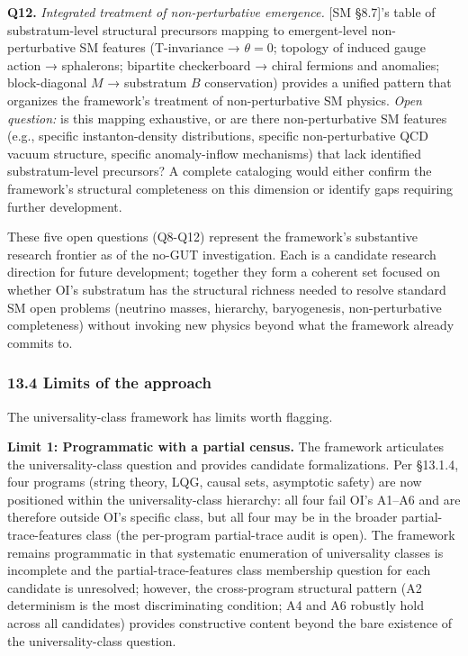 \documentclass[
]{article}
\begin{document}
\textbf{Q12.} \emph{Integrated treatment of non-perturbative emergence.}
{[}SM §8.7{]}'s table of substratum-level structural precursors mapping
to emergent-level non-perturbative SM features (T-invariance →
\(\theta = 0\); topology of induced gauge action → sphalerons; bipartite
checkerboard → chiral fermions and anomalies; block-diagonal \(M\) →
substratum \(B\) conservation) provides a unified pattern that organizes
the framework's treatment of non-perturbative SM physics. \emph{Open
question:} is this mapping exhaustive, or are there non-perturbative SM
features (e.g., specific instanton-density distributions, specific
non-perturbative QCD vacuum structure, specific anomaly-inflow
mechanisms) that lack identified substratum-level precursors? A complete
cataloging would either confirm the framework's structural completeness
on this dimension or identify gaps requiring further development.

These five open questions (Q8-Q12) represent the framework's substantive
research frontier as of the no-GUT investigation. Each is a candidate
research direction for future development; together they form a coherent
set focused on whether OI's substratum has the structural richness
needed to resolve standard SM open problems (neutrino masses, hierarchy,
baryogenesis, non-perturbative completeness) without invoking new
physics beyond what the framework already commits to.

\hypertarget{limits-of-the-approach}{%
\subsubsection{13.4 Limits of the
approach}\label{limits-of-the-approach}}

The universality-class framework has limits worth flagging.

\textbf{Limit 1: Programmatic with a partial census.} The framework
articulates the universality-class question and provides candidate
formalizations. Per §13.1.4, four programs (string theory, LQG, causal
sets, asymptotic safety) are now positioned within the
universality-class hierarchy: all four fail OI's A1--A6 and are
therefore outside OI's specific class, but all four may be in the
broader partial-trace-features class (the per-program partial-trace
audit is open). The framework remains programmatic in that systematic
enumeration of universality classes is incomplete and the
partial-trace-features class membership question for each candidate is
unresolved; however, the cross-program structural pattern (A2
determinism is the most discriminating condition; A4 and A6 robustly
hold across all candidates) provides constructive content beyond the
bare existence of the universality-class question.
\end{document}
